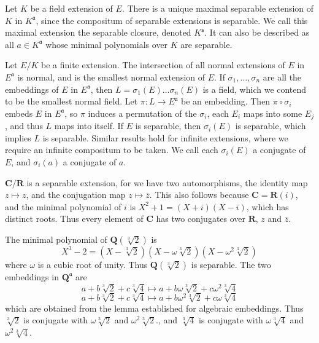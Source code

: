 \begin{example}
    Let $K$ be a field extension of $E$. There is a unique maximal separable extension of $K$ in $K^{\mathfrak{a}}$, since the compositum of separable extensions is separable. We call this maximal extension the separable closure, denoted $K^{\mathfrak{s}}$. It can also be described as all $a \in K^{\mathfrak{a}}$ whose minimal polynomials over $K$ are separable.
\end{example}

Let $E/K$ be a finite extension. The intersection of all normal extensions of $E$ in $E^{\mathfrak{a}}$ is normal, and is the smallest normal extension of $E$. If $\sigma_1, \dots, \sigma_n$ are all the embeddings of $E$ in $E^{\mathfrak{a}}$, then $L = \sigma_1(E) \dots \sigma_n(E)$ is a field, which we contend to be the smallest normal field. Let $\pi: L \to E^{\mathfrak{a}}$ be an embedding. Then $\pi \circ \sigma_i$ embeds $E$ in $E^{\mathfrak{a}}$, so $\pi$ induces a permutation of the $\sigma_i$, each $E_i$ maps into some $E_j$, and thus $L$ maps into itself. If $E$ is separable, then $\sigma_i(E)$ is separable, which implies $L$ is separable. Similar results hold for infinite extensions, where we require an infinite compositum to be taken. We call each $\sigma_i(E)$ a conjugate of $E$, and $\sigma_i(a)$ a conjugate of $a$.

\begin{example}
    $\mathbf{C}/\mathbf{R}$ is a separable extension, for we have two automorphisms, the identity map $z \mapsto z$, and the conjugation map $z \mapsto \overline{z}$. This also follows because $\mathbf{C} = \mathbf{R}(i)$, and the minimal polynomial of $i$ is $X^2 + 1 = (X + i)(X - i)$, which has distinct roots. Thus every element of $\mathbf{C}$ has two conjugates over $\mathbf{R}$, $z$ and $\overline{z}$.
\end{example}

\begin{example}
    The minimal polynomial of $\mathbf{Q}(\sqrt[3]{2})$ is
    \[ X^3 - 2 = (X - \sqrt[3]{2})(X - \omega \sqrt[3]{2})(X - \omega^2 \sqrt[3]{2}) \]
    where $\omega$ is a cubic root of unity. Thus $\mathbf{Q}(\sqrt[3]{2})$ is separable. The two embeddings in $\mathbf{Q}^{\mathfrak{a}}$ are
    \[ a + b \sqrt[3]{2} + c \sqrt[3]{4} \mapsto a + b \omega \sqrt[3]{2} + c \omega^2 \sqrt[3]{4} \]
    \[ a + b \sqrt[3]{2} + c \sqrt[3]{4} \mapsto a + b \omega^2 \sqrt[3]{2} + c \omega \sqrt[3]{4} \]
    which are obtained from the lemma established for algebraic embeddings. Thus $\sqrt[3]{2}$ is conjugate with $\omega \sqrt[3]{2}$ and $\omega^2 \sqrt[3]{2}$., and $\sqrt[3]{4}$ is conjugate with $\omega \sqrt[3]{4}$ and $\omega^2 \sqrt[3]{4}$.
\end{example}

